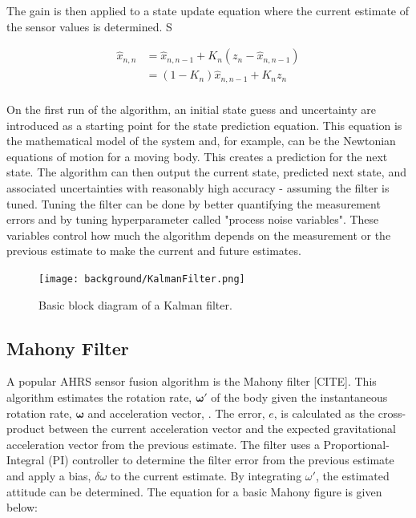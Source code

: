 The gain is then applied to a state update equation where the current estimate of the sensor values is determined. S

\begin{equation} \label{eq:kalman_state_update_eq}
    \begin{aligned}
        \hat{x}_{n,n} &= \hat{x}_{n,n-1} + K_n(z_n - \hat{x}_{n,n-1}) \\
                      &= (1-K_n)\hat{x}_{n,n-1} + K_n z_n \\
    \end{aligned}
\end{equation}

On the first run of the algorithm, an initial state guess and uncertainty are introduced as a starting point for the state prediction equation.
This equation is the mathematical model of the system and, for example, can be the Newtonian equations of motion for a moving body.
This creates a prediction for the next state.
The algorithm can then output the current state, predicted next state, and associated uncertainties with reasonably high accuracy - assuming the filter is tuned.
Tuning the filter can be done by better quantifying the measurement errors and by tuning hyperparameter called "process noise variables".
These variables control how much the algorithm depends on the measurement or the previous estimate to make the current and future estimates.

\begin{figure}[h!]
    \caption[Kalman filter block diagram]{Basic block diagram of a Kalman filter.}
    \label{fig:kalman_filter}
    \centering
    \texttt{[image: background/KalmanFilter.png]}
\end{figure}

\subsection{Mahony Filter} \label{ssec:mahony_filter}
A popular AHRS sensor fusion algorithm is the Mahony filter [CITE].
This algorithm estimates the rotation rate, $\pmb{\omega}'$ of the body given the instantaneous rotation rate, $\pmb{\omega}$ and acceleration vector, .
The error, $e$, is calculated as the cross-product between the current acceleration vector and the expected gravitational acceleration vector from the previous estimate.
The filter uses a Proportional-Integral (PI) controller to determine the filter error from the previous estimate and apply a bias, $\delta\omega$ to the current estimate.
By integrating $\omega'$, the estimated attitude can be determined.
The equation for a basic Mahony figure is given below:


